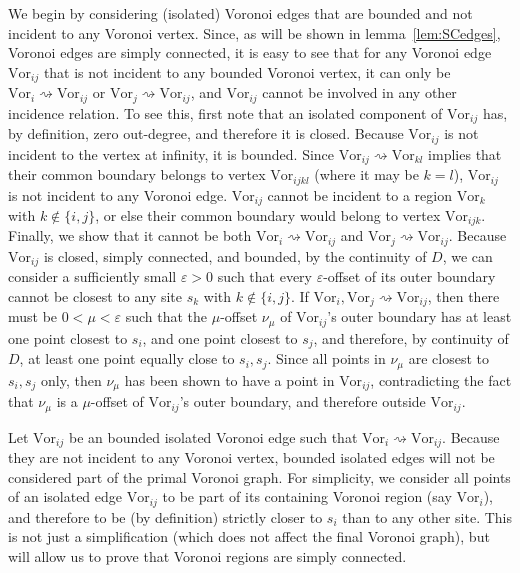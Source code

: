 \documentclass[11pt]{article}
\newcommand{\Vor}{\text{Vor}}
\begin{document}
We begin by considering (isolated) Voronoi edges that are bounded and not incident to any Voronoi vertex. 
Since, as will be shown in lemma~\ref{lem:SCedges}, 
	Voronoi edges are simply connected, 
	it is easy to see that for any Voronoi edge $\Vor_{ij}$
		that is not incident to any bounded Voronoi vertex,
	it can only be $\Vor_i\rightsquigarrow\Vor_{ij}$ or $\Vor_j\rightsquigarrow\Vor_{ij}$, 
	and $\Vor_{ij}$ cannot be involved in any other incidence relation. 
To see this, first note that an isolated component of $\Vor_{ij}$ has, 
	by definition, zero out-degree, and therefore it is closed. 
Because $\Vor_{ij}$ is not incident to the vertex at infinity, it is bounded. 
Since $\Vor_{ij}\rightsquigarrow\Vor_{kl}$ implies 
	that their common boundary belongs to vertex $\Vor_{ijkl}$ (where it may be $k=l$), 
	$\Vor_{ij}$ is not incident to any Voronoi edge. 
$\Vor_{ij}$ cannot be incident to a region $\Vor_k$ with $k\notin\{i,j\}$, 
	or else their common boundary would belong to vertex $\Vor_{ijk}$. 
Finally, we show that it cannot be 
	both $\Vor_i\rightsquigarrow\Vor_{ij}$ and $\Vor_j\rightsquigarrow\Vor_{ij}$. 
Because $\Vor_{ij}$ is closed, simply connected, and bounded, 
	by the continuity of $D$, 
	we can consider a sufficiently small $\varepsilon > 0$ 
	such that every $\varepsilon$-offset of its outer boundary cannot be 
	closest to any site $s_k$ with $k\notin\{i,j\}$. 
If $\Vor_i,\Vor_j\rightsquigarrow\Vor_{ij}$, then 
	there must be $0 < \mu < \varepsilon$ 
	such that the $\mu$-offset $\nu_\mu$ of $\Vor_{ij}$'s outer boundary 
	has at least one point closest to $s_i$, and one point closest to $s_j$, 
and therefore, by continuity of $D$, at least one point equally close to $s_i,s_j$. 
Since all points in $\nu_\mu$ are closest to $s_i,s_j$ only, then $\nu_\mu$ has 
	been shown to have a point in $\Vor_{ij}$, 
	contradicting the fact that $\nu_\mu$ is a $\mu$-offset of $\Vor_{ij}$'s outer boundary, 
	and therefore outside $\Vor_{ij}$. 


Let $\Vor_{ij}$ be an bounded isolated Voronoi edge 
	such that $\Vor_i\rightsquigarrow\Vor_{ij}$. 
Because they are not incident to any Voronoi vertex, 
	bounded isolated edges will not be considered part of the primal Voronoi graph.
For simplicity, we consider all points of an isolated edge $\Vor_{ij}$ to be part of its containing
	Voronoi region (say $\Vor_i$), 
	and therefore to be (by definition) strictly closer to $s_i$ than to any other site. 
This is not just a simplification (which does not affect the final Voronoi graph), 
	but will allow us to prove that Voronoi regions are simply connected. 
	
\end{document}

